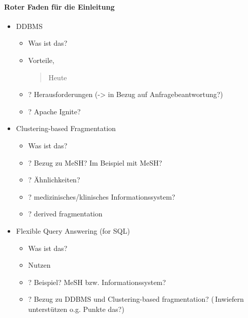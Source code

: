 \paragraph{Roter Faden für die Einleitung}

\begin{itemize}
    \item DDBMS
    \begin{itemize}
        \item Was ist das?
        \item Vorteile, \begin{quote}Heute\end{quote}
        \item ? Herausforderungen (-> in Bezug auf Anfragebeantwortung?)
        \item ? Apache Ignite?
    \end{itemize}
    
    \item Clustering-based Fragmentation
    \begin{itemize}
        \item Was ist das?
        \item ? Bezug zu MeSH? Im Beispiel mit MeSH?
        \item ? Ähnlichkeiten?
        \item ? medizinisches/klinisches Informationssystem?
        \item ? derived fragmentation
    \end{itemize}
    
    \item Flexible Query Answering (for SQL)
    \begin{itemize}
        \item Was ist das?
        \item Nutzen
        \item ? Beispiel? MeSH bzw. Informationssystem?
        \item ? Bezug zu DDBMS und Clustering-based fragmentation?\newline
                (\textrightarrow\,Inwiefern unterstützen o.g. Punkte das?)
    \end{itemize}
\end{itemize}
